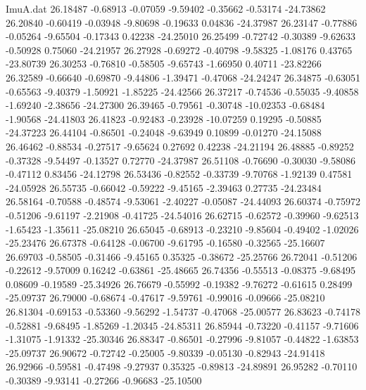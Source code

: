 \begin{filecontents}{ImuA.dat}
  26.18487   -0.68913   -0.07059   -9.59402   -0.35662   -0.53174  -24.73862
  26.20840   -0.60419   -0.03948   -9.80698   -0.19633    0.04836  -24.37987
  26.23147   -0.77886   -0.05264   -9.65504   -0.17343    0.42238  -24.25010
  26.25499   -0.72742   -0.30389   -9.62633   -0.50928    0.75060  -24.21957
  26.27928   -0.69272   -0.40798   -9.58325   -1.08176    0.43765  -23.80739
  26.30253   -0.76810   -0.58505   -9.65743   -1.66950    0.40711  -23.82266
  26.32589   -0.66640   -0.69870   -9.44806   -1.39471   -0.47068  -24.24247
  26.34875   -0.63051   -0.65563   -9.40379   -1.50921   -1.85225  -24.42566
  26.37217   -0.74536   -0.55035   -9.40858   -1.69240   -2.38656  -24.27300
  26.39465   -0.79561   -0.30748  -10.02353   -0.68484   -1.90568  -24.41803
  26.41823   -0.92483   -0.23928  -10.07259    0.19295   -0.50885  -24.37223
  26.44104   -0.86501   -0.24048   -9.63949    0.10899   -0.01270  -24.15088
  26.46462   -0.88534   -0.27517   -9.65624    0.27692    0.42238  -24.21194
  26.48885   -0.89252   -0.37328   -9.54497   -0.13527    0.72770  -24.37987
  26.51108   -0.76690   -0.30030   -9.58086   -0.47112    0.83456  -24.12798
  26.53436   -0.82552   -0.33739   -9.70768   -1.92139    0.47581  -24.05928
  26.55735   -0.66042   -0.59222   -9.45165   -2.39463    0.27735  -24.23484
  26.58164   -0.70588   -0.48574   -9.53061   -2.40227   -0.05087  -24.44093
  26.60374   -0.75972   -0.51206   -9.61197   -2.21908   -0.41725  -24.54016
  26.62715   -0.62572   -0.39960   -9.62513   -1.65423   -1.35611  -25.08210
  26.65045   -0.68913   -0.23210   -9.85604   -0.49402   -1.02026  -25.23476
  26.67378   -0.64128   -0.06700   -9.61795   -0.16580   -0.32565  -25.16607
  26.69703   -0.58505   -0.31466   -9.45165    0.35325   -0.38672  -25.25766
  26.72041   -0.51206   -0.22612   -9.57009    0.16242   -0.63861  -25.48665
  26.74356   -0.55513   -0.08375   -9.68495    0.08609   -0.19589  -25.34926
  26.76679   -0.55992   -0.19382   -9.76272   -0.61615    0.28499  -25.09737
  26.79000   -0.68674   -0.47617   -9.59761   -0.99016   -0.09666  -25.08210
  26.81304   -0.69153   -0.53360   -9.56292   -1.54737   -0.47068  -25.00577
  26.83623   -0.74178   -0.52881   -9.68495   -1.85269   -1.20345  -24.85311
  26.85944   -0.73220   -0.41157   -9.71606   -1.31075   -1.91332  -25.30346
  26.88347   -0.86501   -0.27996   -9.81057   -0.44822   -1.63853  -25.09737
  26.90672   -0.72742   -0.25005   -9.80339   -0.05130   -0.82943  -24.91418
  26.92966   -0.59581   -0.47498   -9.27937    0.35325   -0.89813  -24.89891
  26.95282   -0.70110   -0.30389   -9.93141   -0.27266   -0.96683  -25.10500

\end{filecontents}
